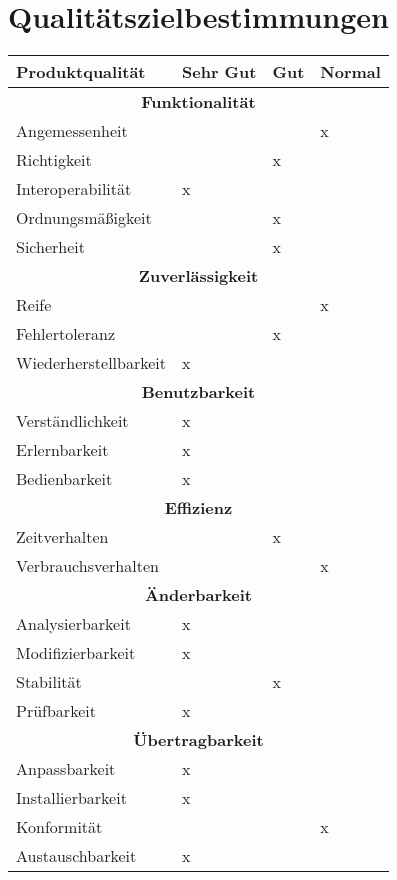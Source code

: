 \chapter{Qualitätszielbestimmungen}
    \renewcommand{\arraystretch}{1.4}
    \begin{center}
    \begin{tabular}{| l || p{3cm} | p{3cm} | p{3cm} |}
        \hline
        \textbf{Produktqualität} & Sehr Gut & Gut & Normal \\ 
        \hline
        \multicolumn{4}{|c|}{\textbf{Funktionalität}} \\
        \hline
        Angemessenheit & & & x \\
        \hline
        Richtigkeit & & x & \\
        \hline
        Interoperabilität & x & & \\
        \hline
        Ordnungsmäßigkeit & & x & \\
        \hline
        Sicherheit & & x & \\
        \hline
        \multicolumn{4}{|c|}{\textbf{Zuverlässigkeit}} \\
        \hline
        Reife & & & x\\
        \hline
        Fehlertoleranz & & x & \\
        \hline
        Wiederherstellbarkeit & x & & \\
        \hline
        \multicolumn{4}{|c|}{\textbf{Benutzbarkeit}} \\
        \hline
        Verständlichkeit & x & & \\
        \hline
        Erlernbarkeit & x & & \\
        \hline
        Bedienbarkeit & x & & \\
        \hline
        \multicolumn{4}{|c|}{\textbf{Effizienz}} \\
        \hline
        Zeitverhalten & & x & \\
        \hline
        Verbrauchsverhalten & & & x \\
        \hline
        \multicolumn{4}{|c|}{\textbf{Änderbarkeit}} \\
        \hline
        Analysierbarkeit & x & & \\
        \hline
        Modifizierbarkeit & x & & \\
        \hline
        Stabilität & & x & \\
        \hline
        Prüfbarkeit & x & & \\
        \hline
        \multicolumn{4}{|c|}{\textbf{Übertragbarkeit}} \\
        \hline
        Anpassbarkeit & x & & \\
        \hline
        Installierbarkeit & x & & \\
        \hline
        Konformität & & & x \\
        \hline
        Austauschbarkeit & x & & \\
        \hline
    \end{tabular}
    \end{center}